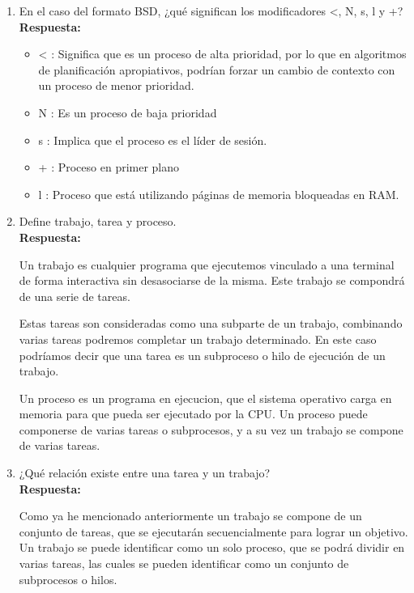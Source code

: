 \documentclass[a4paper,12pt]{article}
\begin{document}
\begin{enumerate}[label=\textbf{Pregunta \arabic*.}]
    \item En el caso del formato BSD, ¿qué significan los modificadores <, N, s, l y +? \\
    \textbf{Respuesta:} 
    
    \begin{itemize}
        \item < : Significa que es un proceso de alta prioridad, por lo que en algoritmos de planificación apropiativos, podrían forzar un cambio de contexto con un proceso de menor prioridad.
        \item N : Es un proceso de baja prioridad
        \item s : Implica que el proceso es el líder de sesión.
        \item + : Proceso en primer plano
        \item l : Proceso que está utilizando páginas de memoria bloqueadas en RAM.
    \end{itemize}

    \item Define trabajo, tarea y proceso. \\
    \textbf{Respuesta:} 

    Un trabajo es cualquier programa que ejecutemos vinculado a una terminal de forma interactiva sin desasociarse de la misma. Este trabajo se compondrá de una serie de tareas.

    Estas tareas son consideradas como una subparte de un trabajo, combinando varias tareas podremos completar un trabajo determinado. En este caso podríamos decir que una tarea es un subproceso o hilo de ejecución de un trabajo.

    Un proceso es un programa en ejecucion, que el sistema operativo carga en memoria para que pueda ser ejecutado por la CPU. Un proceso puede componerse de varias tareas o subprocesos, y a su vez un trabajo se compone de varias tareas.


    \item ¿Qué relación existe entre una tarea y un trabajo? \\
    \textbf{Respuesta:} 
    
    Como ya he mencionado anteriormente un trabajo se compone de un conjunto de tareas, que se ejecutarán secuencialmente para lograr un objetivo. Un trabajo se puede identificar como un solo proceso, que se podrá dividir en varias tareas, las cuales se pueden identificar como un conjunto de subprocesos o hilos. 





\end{enumerate}
\end{document}
